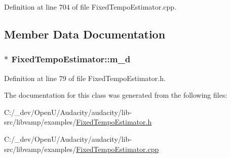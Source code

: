 Definition at line 704 of file Fixed\+Tempo\+Estimator.\+cpp.



\subsection{Member Data Documentation}
\subsubsection[{\texorpdfstring{m\+\_\+d}{m_d}}]{$\ast$ Fixed\+Tempo\+Estimator\+::m\+\_\+d\hspace{0.3cm}{\ttfamily [protected]}}\hypertarget{class_fixed_tempo_estimator_a5e1c9abaf33e9f48eb7d3b48f8af3308}{}\label{class_fixed_tempo_estimator_a5e1c9abaf33e9f48eb7d3b48f8af3308}


Definition at line 79 of file Fixed\+Tempo\+Estimator.\+h.



The documentation for this class was generated from the following files\+:\begin{DoxyCompactItemize}
\item 
C\+:/\+\_\+dev/\+Open\+U/\+Audacity/audacity/lib-\/src/libvamp/examples/\hyperlink{_fixed_tempo_estimator_8h}{Fixed\+Tempo\+Estimator.\+h}\item 
C\+:/\+\_\+dev/\+Open\+U/\+Audacity/audacity/lib-\/src/libvamp/examples/\hyperlink{_fixed_tempo_estimator_8cpp}{Fixed\+Tempo\+Estimator.\+cpp}\end{DoxyCompactItemize}
